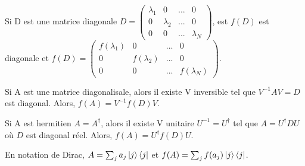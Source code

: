 \documentclass[../notesdecours.tex]{subfiles}
\begin{document}
\begin{Property}
Si D est une matrice diagonale $D = \begin{pmatrix}
\lambda_1 & 0 & ... & 0\\
0 & \lambda_2 & ... & 0\\
0 & 0 & ... & \lambda_N
\end{pmatrix}$, est $f(D)$ est diagonale et $f(D) = \begin{pmatrix}
f(\lambda_1) & 0 & ... & 0\\
0 & f(\lambda_2) & ... & 0\\
0 & 0 & ... & f(\lambda_N)
\end{pmatrix}$.
\end{Property}
\begin{lemma} Si A est une matrice diagonalisale, alors il existe V inversible tel que $V^{-1}AV = D$ est diagonal. Alors, $f(A) = V^{-1}f(D)V$. \end{lemma}
\begin{lemma} Si A est hermitien $A=A^\dag$, alors il existe V unitaire $U^{-1} = U^\dag$ tel que $A = U^{\dag}DU$ où $D$ est diagonal réel. Alors, $f(A) = U^{\dag}f(D)U$. \end{lemma}

\begin{remark} En notation de Dirac, $A = \sum_j a_j \ket{j}\bra{j}$ et $f(A) = \sum_j f(a_j) \ket{j}\bra{j}$. \end{remark}
\end{document}

